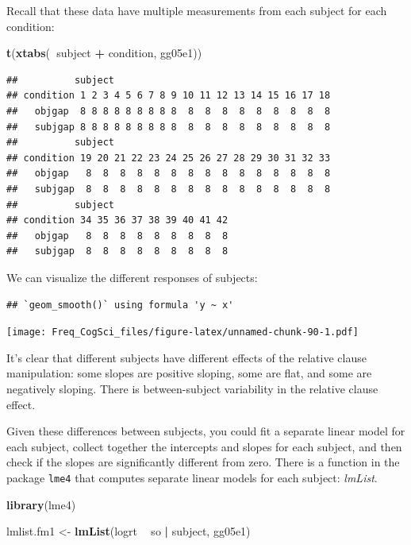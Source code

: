 \documentclass[12pt,]{krantz}
\newenvironment{Shaded}{\begin{snugshade}}{\end{snugshade}}
\newcommand{\KeywordTok}[1]{\textcolor[rgb]{0.13,0.29,0.53}{\textbf{#1}}}
\newcommand{\NormalTok}[1]{#1}
\newcommand{\OperatorTok}[1]{\textcolor[rgb]{0.81,0.36,0.00}{\textbf{#1}}}
\newcommand{\StringTok}[1]{\textcolor[rgb]{0.31,0.60,0.02}{#1}}
\begin{document}
Recall that these data have multiple measurements from each subject for each condition:

\begin{Shaded}
\begin{Highlighting}[]
\KeywordTok{t}\NormalTok{(}\KeywordTok{xtabs}\NormalTok{(}\OperatorTok{~}\NormalTok{subject }\OperatorTok{+}\StringTok{ }\NormalTok{condition, gg05e1))}
\end{Highlighting}
\end{Shaded}

\begin{verbatim}
##          subject
## condition 1 2 3 4 5 6 7 8 9 10 11 12 13 14 15 16 17 18
##   objgap  8 8 8 8 8 8 8 8 8  8  8  8  8  8  8  8  8  8
##   subjgap 8 8 8 8 8 8 8 8 8  8  8  8  8  8  8  8  8  8
##          subject
## condition 19 20 21 22 23 24 25 26 27 28 29 30 31 32 33
##   objgap   8  8  8  8  8  8  8  8  8  8  8  8  8  8  8
##   subjgap  8  8  8  8  8  8  8  8  8  8  8  8  8  8  8
##          subject
## condition 34 35 36 37 38 39 40 41 42
##   objgap   8  8  8  8  8  8  8  8  8
##   subjgap  8  8  8  8  8  8  8  8  8
\end{verbatim}

We can visualize the different responses of subjects:

\begin{verbatim}
## `geom_smooth()` using formula 'y ~ x'
\end{verbatim}

\texttt{[image: Freq\_CogSci\_files/figure-latex/unnamed-chunk-90-1.pdf]}

It's clear that different subjects have different effects of the relative clause manipulation: some slopes are positive sloping, some are flat, and some are negatively sloping. There is between-subject variability in the relative clause effect.

Given these differences between subjects, you could fit a separate linear model for each subject, collect together the intercepts and slopes for each subject, and then check if the slopes are significantly different from zero. There is a function in the package \texttt{lme4} that computes separate linear models for each subject: \emph{lmList}.

\begin{Shaded}
\begin{Highlighting}[]
\KeywordTok{library}\NormalTok{(lme4)}

\NormalTok{lmlist.fm1 <-}\StringTok{ }\KeywordTok{lmList}\NormalTok{(logrt }\OperatorTok{~}\StringTok{ }\NormalTok{so }\OperatorTok{|}\StringTok{ }\NormalTok{subject, gg05e1)}
\end{Highlighting}
\end{Shaded}
\end{document}
